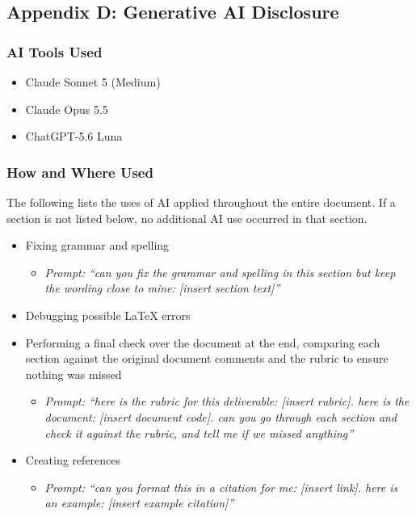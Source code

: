 \documentclass[12pt]{article}
\begin{document}
\subsection{Appendix D: Generative AI Disclosure}
\subsubsection{AI Tools Used}
\begin{itemize}
  \item Claude Sonnet 5 (Medium)
  \item Claude Opus 5.5
  \item ChatGPT-5.6 Luna
\end{itemize}

\subsubsection{How and Where Used}
The following lists the uses of AI applied throughout the entire document. If a section is not listed below, no additional AI use occurred in that section.

\begin{itemize}
  \item Fixing grammar and spelling
  \begin{itemize}
    \item \textit{Prompt: ``can you fix the grammar and spelling in this section but keep the wording close to mine: [insert section text]''}
  \end{itemize}
  \item Debugging possible \LaTeX{} errors
  \item Performing a final check over the document at the end, comparing each section against the original document comments and the rubric to ensure nothing was missed
  \begin{itemize}
    \item \textit{Prompt: ``here is the rubric for this deliverable: [insert rubric]. here is the document: [insert document code]. can you go through each section and check it against the rubric, and tell me if we missed anything''}
  \end{itemize}
  \item Creating references
  \begin{itemize}
    \item \textit{Prompt: ``can you format this in a citation for me: [insert link]. here is an example: [insert example citation]''}
  \end{itemize}
\end{itemize}
\end{document}

